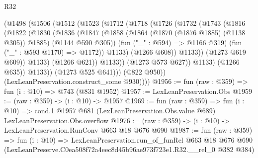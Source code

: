 \begin{lexlean}{R32}
\begin{coremodule}
                  (@1498
                    (@1506
                      (@1512
                        (@1523
                          (@1712
                            (@1718
                              (@1726
                                (@1732
                                  (@1743
                                    (@1816
                                      (@1822
                                        (@1830
                                          (@1836
                                            (@1847
                                              (@1858
                                                (@1864 (@1870 (@1876 @1885) (@1138 @305)) @1885)
                                                (@1144 @590 @305))
                                              (fun ("_" : @594) => @1166 @319)
                                              (fun ("_" : @593 @1170) => @1172))
                                            @1133)
                                          (@1266 @608))
                                        @1133))
                                    (@1273 @619 @609))
                                  @1133)
                                (@1266 @621))
                              @1133))
                          (@1273 @573 @627))
                        @1133)
                      (@1266 @635))
                    @1133))
                (@1273 @525 @641)))
            (@822 @950))
          (LexLeanPreservation.construct_some @930))))
@1956 := fun (raw : @359) => fun (i : @10) => @743 (@831 @1952)
@1957 := LexLeanPreservation.Obs
@1959 := (raw : @359) -> (i : @10) -> @1957
@1969 := fun (raw : @359) =>
  fun (i : @10) =>
  cond.{1} @1957 @681 (LexLeanPreservation.Obs.value @689) LexLeanPreservation.Obs.overflow
@1976 := (raw : @359) -> (i : @10) -> LexLeanPreservation.RunConv @663 @18 @676 @690
@1987 := fun (raw : @359) =>
  fun (i : @10) =>
  LexLeanPreservation.run_of_funRel
    @663
    @18
    @676
    @690
    (LexLeanPreserve.C0ea508f72a4eec8d45b96ae973f723e1.R32.__rel_0 @382 @384)
\end{coremodule}
\end{lexlean}
